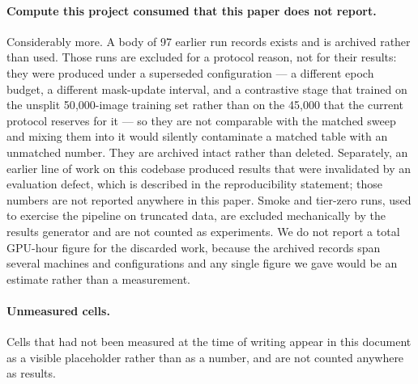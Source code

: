 \paragraph{Compute this project consumed that this paper does not report.}
Considerably more. A body of 97 earlier run records exists and is archived
rather than used. Those runs are excluded for a protocol reason, not for their
results: they were produced under a superseded configuration --- a different
epoch budget, a different mask-update interval, and a contrastive stage that
trained on the unsplit 50{,}000-image training set rather than on the 45{,}000
that the current protocol reserves for it --- so they are not comparable with the
matched sweep and mixing them into it would silently contaminate a matched
table with an unmatched number. They are archived intact rather than deleted.
Separately, an earlier line of work on this codebase produced results that were
invalidated by an evaluation defect, which is described in the reproducibility
statement; those numbers are not reported anywhere in this paper. Smoke and
tier-zero runs, used to exercise the pipeline on truncated data, are excluded
mechanically by the results generator and are not counted as experiments. We do
not report a total GPU-hour figure for the discarded work, because the archived
records span several machines and configurations and any single figure we gave
would be an estimate rather than a measurement.

\paragraph{Unmeasured cells.}
Cells that had not been measured at the time of writing appear in this document
as a visible placeholder rather than as a number, and are not counted anywhere
as results.
